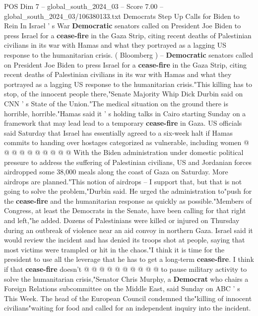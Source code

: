 \begin{textsample}{POS Dim 7 – global\_south\_2024\_03 – Score 7.00 – global\_south\_2024\_03/106380133.txt}  \label{ex:f7_pos_162}
Democrats Step Up Calls for Biden to Rein In Israel ' s War \textbf{Democratic} senators called on President Joe Biden to press Israel for a \textbf{cease-fire} in the Gaza Strip, citing recent deaths of Palestinian civilians in its war with Hamas and what they portrayed as a lagging US response to the humanitarian crisis. ( Bloomberg ) -- \textbf{Democratic} senators called on President Joe Biden to press Israel for a \textbf{cease-fire} in the Gaza Strip, citing recent deaths of Palestinian civilians in its war with Hamas and what they portrayed as a lagging US response to the humanitarian crisis."This killing has to stop, of the innocent people there,"Senate Majority Whip Dick Durbin said on CNN ' s State of the Union."The medical situation on the ground there is horrible, horrible."Hamas said it ' s holding talks in Cairo starting Sunday on a framework that may lead lead to a temporary \textbf{cease-fire} in Gaza.
US officials said Saturday that Israel has essentially agreed to a six-week halt if Hamas commits to handing over hostages categorized as vulnerable, including women @ @ @ @ @ @ @ @ @ @ With the Biden administration under domestic political pressure to address the suffering of Palestinian civilians, US and Jordanian forces airdropped some 38,000 meals along the coast of Gaza on Saturday.
More airdrops are planned."This notion of airdrops -- I support that, but that is not going to solve the problem,"Durbin said.
He urged the administration to"push for the \textbf{cease-fire} and the humanitarian response as quickly as possible."Members of Congress, at least the Democrats in the Senate, have been calling for that right and left,"he added.
Dozens of Palestinians were killed or injured on Thursday during an outbreak of violence near an aid convoy in northern Gaza.
Israel said it would review the incident and has denied its troops shot at people, saying that most victims were trampled or hit in the chaos."I think it is time for the president to use all the leverage that he has to get a long-term \textbf{cease-fire}.
I think if that \textbf{cease-fire} doesn't @ @ @ @ @ @ @ @ @ @ to pause military activity to solve the humanitarian crisis,"Senator Chris Murphy, a \textbf{Democrat} who chairs a Foreign Relations subcommittee on the Middle East, said Sunday on ABC ' s This Week.
The head of the European Council condemned the"killing of innocent civilians"waiting for food and called for an independent inquiry into the incident.

\end{textsample}
